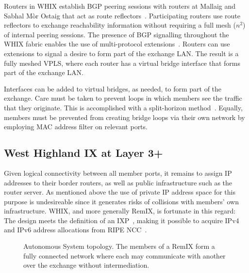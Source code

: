 Routers in \ac{WHIX} establish \acs{BGP} peering sessions with routers at
Mallaig and Sabhal M\`{o}r Ostaig that act as route reflectors~\cite{rfc4456}.
Participating routers use route reflectors to exchange reachability information
without requiring a full mesh ($n^2$) of internal peering sessions. The presence
of \acs{BGP} signalling throughout the \ac{WHIX} fabric enables the use of
multi-protocol extensions~\cite{rfc4760}. Routers can use extensions to signal a
desire to form part of the exchange \acs{LAN}.
The result is a fully meshed \acs{VPLS}, where each router has a virtual bridge
interface that forms part of the exchange \acs{LAN}.

Interfaces can be added to virtual bridges, as needed, to
form part of the exchange. Care must be taken to prevent loops in which members
see the traffic that they originate. This is accomplished with a split-horizon
method~\cite{rfc4762}. Equally, members must be prevented from creating bridge
loops via their own network by employing \acs{MAC} address filter on relevant
ports.

\subsection{West Highland IX at Layer 3+}

Given logical connectivity between all member ports, it remains to assign IP
addresses to their border routers, as well as public infrastructure such as the
router server. As mentioned above the use of private IP address space for this
purpose is undesireable since it generates risks of collisions with members' own
infrastructure. \ac{WHIX}, and more generally RemIX, is fortunate in this
regard: The design meets the definition of an \ac{IXP}~\cite{ripe451,whixrules},
making it possible to acquire IPv4 and IPv6 address allocations from RIPE
NCC~\cite{ripe649}.

\begin{figure}[h]
  \resizebox{\linewidth}{!}{
    \begin{tikzpicture}
      \whixtopodiagram
    \end{tikzpicture}
  }
  \caption{
  Autonomous System topology. The members of a RemIX form a fully
  connected network where each may communicate with another over the
  exchange without intermediation.
  }
  \label{fig:l3}
\end{figure}

